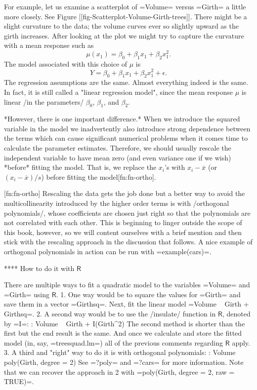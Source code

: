 For example, let us examine a scatterplot of =Volume= versus =Girth= a
little more closely. See Figure [[fig-Scatterplot-Volume-Girth-trees]]. There
might be a slight curvature to the data; the volume curves ever so
slightly upward as the girth increases. After looking at the plot we
might try to capture the curvature with a mean response such as
\begin{equation}
\mu(x_{1})=\beta_{0}+\beta_{1}x_{1}+\beta_{2}x_{1}^{2}.
\end{equation}
The model associated with this choice of \(\mu\) is
\begin{equation}
Y=\beta_{0}+\beta_{1}x_{1}+\beta_{2}x_{1}^{2}+\epsilon.
\end{equation}
The regression assumptions are the same. Almost everything indeed is
the same. In fact, it is still called a "linear regression model",
since the mean response \(\mu\) is linear /in the parameters/
\(\beta_{0}\), \(\beta_{1}\), and \(\beta_{2}\).

*However, there is one important difference.* When we introduce the
squared variable in the model we inadvertently also introduce strong
dependence between the terms which can cause significant numerical
problems when it comes time to calculate the parameter
estimates. Therefore, we should usually rescale the independent
variable to have mean zero (and even variance one if we wish) *before*
fitting the model. That is, we replace the \(x_{i}\)'s with
\(x_{i}-\overline{x}\) (or \((x_{i}-\overline{x})/s\)) before fitting
the model[fn:fn-ortho].

[fn:fn-ortho] Rescaling the data gets the job done but a better way to
avoid the multicollinearity introduced by the higher order terms is
with /orthogonal polynomials/, whose coefficients are chosen just
right so that the polynomials are not correlated with each other. This
is beginning to linger outside the scope of this book, however, so we
will content ourselves with a brief mention and then stick with the
rescaling approach in the discussion that follows. A nice example of
orthogonal polynomials in action can be run with =example(cars)=.

**** How to do it with \(\mathsf{R}\)

There are multiple ways to fit a quadratic model to the variables
=Volume= and =Girth= using \(\mathsf{R}\).
1. One way would be to square the values for =Girth= and save them in
   a vector =Girthsq=. Next, fit the linear model =Volume ~ Girth +
   Girthsq=.
2. A second way would be to use the /insulate/ function in
   \(\mathsf{R}\), denoted by =I=:
   : Volume ~ Girth + I(Girth^2)
   The second method is shorter than the first but the end result is
   the same. And once we calculate and store the fitted model (in,
   say, =treesquad.lm=) all of the previous comments regarding
   \(\mathsf{R}\) apply.
3. A third and "right" way to do it is with orthogonal polynomials:
   :  Volume ~ poly(Girth, degree = 2)
   See =?poly= and =?cars= for more information. Note that we can
   recover the approach in 2 with =poly(Girth, degree = 2, raw =
   TRUE)=.

